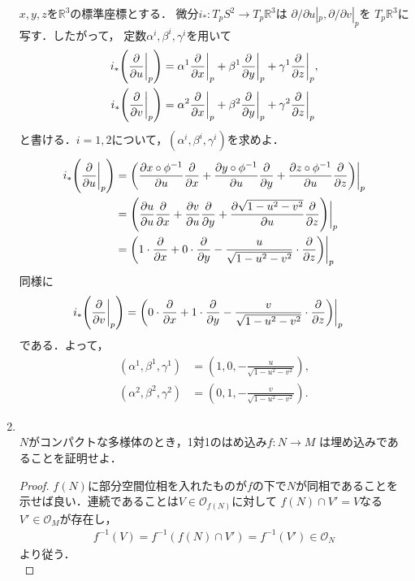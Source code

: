 \documentclass[dvipdfmx,a4paper,11pt]{jsarticle}
\begin{document}
\begin{enumerate}
  $x,y,z$を$\mathbb{R}^3$の標準座標とする．
  微分$i_*\colon T_p S^2\to T_p\mathbb{R}^3$は
  $\partial/\partial u|_p,\partial/\partial v|_p$を
  $T_p\mathbb{R}^3$に写す．したがって，
  定数$\alpha^i,\beta^i,\gamma^i$を用いて
  \begin{align}
    i_*\qty(\pdv{}{u}\bigg|_{p})
    &=\alpha^1\pdv{}{x}\bigg|_{p}
    +\beta^1\pdv{}{y}\bigg|_{p}
    +\gamma^1\pdv{}{z}\bigg|_{p},\\
    i_*\qty(\pdv{}{v}\bigg|_{p})
    &=\alpha^2\pdv{}{x}\bigg|_{p}
    +\beta^2\pdv{}{y}\bigg|_{p}
    +\gamma^2\pdv{}{z}\bigg|_{p}
  \end{align}
  と書ける．$i=1,2$について，$(\alpha^i,\beta^i,\gamma^i)$を求めよ．\\
  \begin{align}
    i_*\qty(\pdv{}{u}\bigg|_{p})
    &=\qty(\pdv{x\circ \phi^{-1}}{u}\pdv{}{x}
    +\pdv{y\circ \phi^{-1}}{u}\pdv{}{y}
    +\pdv{z\circ \phi^{-1}}{u}\pdv{}{z})\bigg|_{p}\\
    &=\qty(\pdv{u}{u}\pdv{}{x}
    +\pdv{v}{u}\pdv{}{y}
    +\pdv{\sqrt{1-u^2-v^2}}{u}\pdv{}{z})\bigg|_{p}\\
    &=\qty(1\cdot\pdv{}{x}
    +0\cdot\pdv{}{y}
    -\frac{u}{\sqrt{1-u^2-v^2}}\cdot\pdv{}{z})\bigg|_{p}
  \end{align}
  同様に
  \begin{align}
    i_*\qty(\pdv{}{v}\bigg|_{p})
    &=\qty(0\cdot\pdv{}{x}
    +1\cdot\pdv{}{y}
    -\frac{v}{\sqrt{1-u^2-v^2}}\cdot\pdv{}{z})\bigg|_{p}
  \end{align}
  である．よって，
  \begin{align}
    (\alpha^1,\beta^1,\gamma^1)&=\left(1,0,-\frac{u}{\sqrt{1-u^2-v^2}}\right),\\
    (\alpha^2,\beta^2,\gamma^2)&=\left(0,1,-\frac{v}{\sqrt{1-u^2-v^2}}\right).
  \end{align}
  \item {}\\
  $N$がコンパクトな多様体のとき，1対1のはめ込み$f\colon N\to M$
  は埋め込みであることを証明せよ．
  \begin{proof}
    $f(N)$に部分空間位相を入れたものが$f$の下で$N$が同相であることを
    示せば良い．連続であることは$V\in \mathcal{O}_{f(N)}$に対して
    $f(N)\cap V'=V$なる$V'\in\mathcal{O}_M$が存在し，
    \begin{align}
      f^{-1}(V)=f^{-1}(f(N)\cap V')=f^{-1}(V')\in\mathcal{O}_N
    \end{align}
    より従う．\\

\end{proof}
\end{enumerate}
\end{document}
